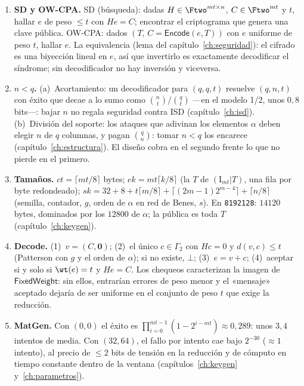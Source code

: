 \begin{enumerate}[leftmargin=1.9em,itemsep=5pt]
  \item \textbf{SD y OW-CPA.} SD (búsqueda): dadas $H\in\Ftwo^{mt
        \times n}$, $C\in\Ftwo^{mt}$ y $t$, hallar $e$ de peso
        $\le t$ con $He=C$; encontrar el criptograma que genera
        una clave pública. OW-CPA: dados $(T,\,C=\textsf{Encode}(e,T))$
        con $e$ uniforme de peso $t$, hallar $e$. La
        equivalencia (lema del capítulo~\ref{ch:seguridad}): el
        cifrado es una biyección lineal en $e$, así que invertirlo
        es exactamente decodificar el síndrome; sin decodificador
        no hay inversión y viceversa.

  \item \textbf{$n<q$.} (a)~Acortamiento: un decodificador para
        $(q,q,t)$ resuelve $(q,n,t)$ con éxito que decae a lo sumo
        como $\binom{n}{t}/\binom{q}{t}$ ---en el modelo 1/2, unos
        $0{,}8$ bits---: bajar $n$ no regala seguridad contra ISD
        (capítulo~\ref{ch:isd}). (b)~División del soporte: los
        ataques que adivinan los elementos $\alpha$ deben elegir
        $n$ de $q$ columnas, y pagan $\binom{q}{n}$: tomar
        $n<q$ los encarece (capítulo~\ref{ch:estructura}). El
        diseño cobra en el segundo frente lo que no pierde en el
        primero.

  \item \textbf{Tamaños.} $ct=\lceil mt/8\rceil$ bytes;
        $ek=mt\lceil k/8\rceil$ (la $T$ de
        $(\mathrm{I}_{mt}|T)$, una fila por byte redondeado);
        $sk=32+8+t\lceil m/8\rceil+\lceil(2m-1)2^{m-4}\rceil
        +\lceil n/8\rceil$ (semilla, contador, $g$, orden de
        $\alpha$ en red de Benes, $s$). En \texttt{8192128}:
        $14120$ bytes, dominados por los $12800$ de $\alpha$;
        la pública es toda $T$ (capítulo~\ref{ch:keygen}).

  \item \textbf{Decode.} (1)~$v=(C,\mathbf{0})$; (2)~el único
        $c\in\Gamma_2$ con $Hc=0$ y $d(v,c)\le t$ (Patterson con
        $g$ y el orden de $\alpha$); si no existe, $\bot$;
        (3)~$e=v+c$; (4)~aceptar si y solo si $\wt(e)=t$ y
        $He=C$. Los chequeos caracterizan la imagen de
        $\textsf{FixedWeight}$: sin ellos, entrarían errores de
        peso menor y el «mensaje» aceptado dejaría de ser uniforme en
        el conjunto de peso $t$ que exige la reducción.

  \item \textbf{MatGen.} Con $(0,0)$ el éxito es
        $\prod_{i=0}^{mt-1}(1-2^{i-mt})\approx0{,}289$: unos
        $3{,}4$ intentos de media. Con $(32,64)$, el fallo por
        intento cae bajo $2^{-30}$ ($\approx1$ intento), al
        precio de $\le2$ bits de tensión en la reducción y de
        cómputo en tiempo constante dentro de la ventana
        (capítulos~\ref{ch:keygen} y~\ref{ch:parametros}).


\end{enumerate}
